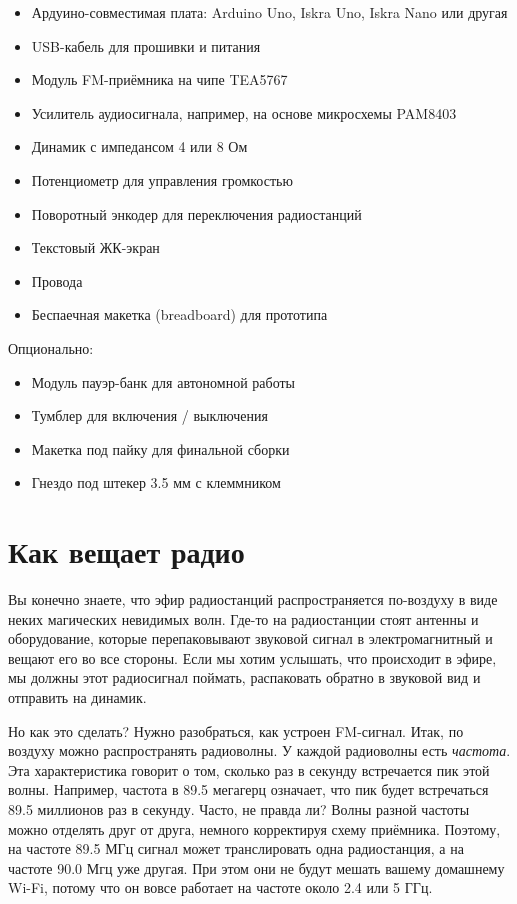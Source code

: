 \begin{itemize}
\item Ардуино-совместимая плата: Arduino Uno, Iskra Uno, Iskra Nano или другая
\item USB-кабель для прошивки и питания
\item Модуль FM-приёмника на чипе TEA5767
\item Усилитель аудиосигнала, например, на основе микросхемы PAM8403
\item Динамик с импедансом 4 или 8 Ом
\item Потенциометр для управления громкостью
\item Поворотный энкодер для переключения радиостанций
\item Текстовый ЖК-экран
\item Провода
\item Беспаечная макетка (breadboard) для прототипа
\end{itemize}

Опционально:

\begin{itemize}
\item Модуль пауэр-банк для автономной работы
\item Тумблер для включения / выключения
\item Макетка под пайку для финальной сборки
\item Гнездо под штекер 3.5 мм с клеммником
\end{itemize}

\section{Как вещает радио}

Вы конечно знаете, что эфир радиостанций распространяется по-воздуху в виде неких магических невидимых волн. Где-то на радиостанции стоят антенны и оборудование, которые перепаковывают звуковой сигнал в электромагнитный и вещают его во все стороны. Если мы хотим услышать, что происходит в эфире, мы должны этот радиосигнал поймать, распаковать обратно в звуковой вид и отправить на динамик.

Но как это сделать? Нужно разобраться, как устроен FM-сигнал. Итак, по воздуху можно распространять радиоволны. У каждой радиоволны есть \emph{частота}. Эта характеристика говорит о том, сколько раз в секунду встречается пик этой волны. Например, частота в 89.5 мегагерц означает, что пик будет встречаться 89.5 миллионов раз в секунду. Часто, не правда
ли? Волны разной частоты можно отделять друг от друга, немного корректируя схему приёмника. Поэтому, на частоте 89.5 МГц сигнал может транслировать одна радиостанция, а на частоте 90.0 Мгц уже другая. При этом они не будут мешать вашему домашнему Wi-Fi, потому что он вовсе работает на частоте около 2.4 или 5 ГГц.

